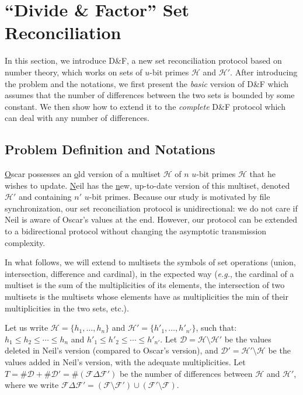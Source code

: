 \documentclass[twoside,envcountsame,runningheads]{llncs}
\newcommand{\Set}{\mathcal{H}}
\newcommand{\SetD}{\mathcal{D}}
\newcommand{\Files}{\mathcal{F}}
\newcommand{\df}{D\&F\xspace}
\newcommand{\eg}{\textit{e.g.}\xspace}
\newcommand{\comm}[1]{\todo{#1}}
\begin{document}
\section{``Divide \& Factor'' Set Reconciliation}
\label{sec:dandf}

In this section, we introduce \df, a new set reconciliation protocol based on number theory, which works on sets of $u$-bit primes $\Set$ and $\Set'$.
After introducing the problem and the notations, we first present the \emph{basic} version of \df which assumes that the number of differences between the two sets is bounded by some constant.
We then show how to extend it to the \emph{complete} \df protocol which can deal with any number of differences.

\subsection{Problem Definition and Notations}

\underline{O}scar possesses an \underline{o}ld version of a multiset $\Set$ of $n$ $u$-bit primes $\Set$ that he wishes to update.
\underline{N}eil has the \underline{n}ew, up-to-date version of this multiset, denoted $\Set'$ and containing $n'$ $u$-bit primes.
Because our study is motivated by file synchronization, our set reconciliation protocol is unidirectional: we do not care if Neil is aware of Oscar's values at the end. However, our protocol can be extended to a bidirectional protocol without changing the asymptotic transmission complexity.

In what follows, we will extend to multisets the symbols of set operations (union, intersection, difference and cardinal), in the expected way (\eg, the cardinal of a multiset is the sum of the multiplicities of its elements, the intersection of two multisets is the multisets whose elements have as multiplicities the min of their multiplicities in the two sets, etc.).

Let us write $\Set = \{h_1,\dots,h_n\}$ and $\Set' = \{h'_1,\dots,h'_{n'}\}$, such that: $h_1 \leq h_2 \leq \cdots \leq h_n$ and $h'_1 \leq h'_2 \leq \cdots \leq h'_{n'}$.
Let $\SetD = \Set \setminus \Set'$ be the values deleted in Neil's version (compared to Oscar's version), and $\SetD' = \Set' \setminus \Set$ be the values added in Neil's version, with the adequate multiplicities.
Let $T = \# \SetD + \# \SetD' = \# \left( \Files \Delta \Files' \right)$ be the number of differences between $\Set$ and $\Set'$, where we write
$ \Files \Delta \Files' = (\Files \setminus \Files') \cup (\Files' \setminus \Files)$.
\end{document}

